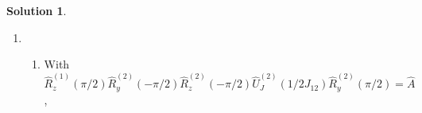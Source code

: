 \documentclass[10pt]{article}
\theoremstyle{definition}
\newtheorem{soln}{Solution}
\begin{document}
\begin{soln}
\begin{enumerate}[label=(\alph*)]
\begin{enumerate}[label=(\arabic*)]
            \item \begin{align*}
                    \hat{R}_y^{(2)}(-\pi/2)\hat{R}_z^{(2)}(-\pi/2)\hat{U}_J^{(2)}(1/2J_{12})\hat{R}_y^{(2)}(\pi/2) & =_{(1)}\frac{1}{4}(\hat{I}^{(2)}+i\hat{\sigma}_y^{(2)})(\hat{I}^{(2)}+i\hat{\sigma}_z^{(2)})\ket{1}\bra{1}^{(1)}\otimes(\hat{I}^{(2)}-i\hat{\sigma}_y^{(2)}+i\hat{\sigma}_z^{(2)}-i\hat{\sigma}_x^{(2)}) \\
                                                                                                                   & =_{(1)}\frac{1}{4}(\hat{I}^{(2)}+i\hat{\sigma}_z^{(2)}+i\hat{\sigma}_y^{(2)}-\hat{\sigma}_x^{(2)})                                                                                                       \\
                                                                                                                   & \quad\ket{1}\bra{1}^{(1)}\otimes(\hat{I}^{(2)}-i\hat{\sigma}_y^{(2)}+i\hat{\sigma}_z^{(2)}-i\hat{\sigma}_x^{(2)})                                                                                        \\
                  \end{align*}
          \end{enumerate}
          \newpage
    \item ~\begin{enumerate}[label=(\arabic*)]
            \item With $\hat{R}_z^{(1)}(\pi/2)\hat{R}_y^{(2)}(-\pi/2)\hat{R}_z^{(2)}(-\pi/2)\hat{U}_J^{(2)}(1/2J_{12})\hat{R}_y^{(2)}(\pi/2)=\hat{A}$,


\end{enumerate}
\end{enumerate}
\end{soln}
\end{document}
